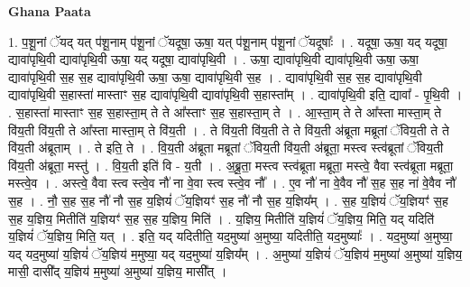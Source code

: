 \documentclass[17pt]{extarticle}
\begin{document}
\textbf{Ghana Paata } \newline

1. प॒शू॒नां ॅयद् यत् प॑शू॒नाम् प॑शू॒नां ॅयदूषा॒ ऊषा॒ यत् प॑शू॒नाम् प॑शू॒नां ॅयदूषाः᳚ । . यदूषा॒ ऊषा॒ यद् यदूषा॒ द्यावा॑पृथि॒वी द्यावा॑पृथि॒वी ऊषा॒ यद् यदूषा॒ द्यावा॑पृथि॒वी । . ऊषा॒ द्यावा॑पृथि॒वी द्यावा॑पृथि॒वी ऊषा॒ ऊषा॒ द्यावा॑पृथि॒वी स॒ह स॒ह द्यावा॑पृथि॒वी ऊषा॒ ऊषा॒ द्यावा॑पृथि॒वी स॒ह । . द्यावा॑पृथि॒वी स॒ह स॒ह द्यावा॑पृथि॒वी द्यावा॑पृथि॒वी स॒हास्ता॑ मास्ताꣳ स॒ह द्यावा॑पृथि॒वी द्यावा॑पृथि॒वी स॒हास्ता᳚म् । . द्यावा॑पृथि॒वी इति॒ द्यावा᳚ - पृ॒थि॒वी । . स॒हास्ता॑ मास्ताꣳ स॒ह स॒हास्ता॒म् ते ते आ᳚स्ताꣳ स॒ह स॒हास्ता॒म् ते । . आ॒स्ता॒म् ते ते आ᳚स्ता मास्ता॒म् ते वि॑य॒ती वि॑य॒ती ते आ᳚स्ता मास्ता॒म् ते वि॑य॒ती । . ते वि॑य॒ती वि॑य॒ती ते ते वि॑य॒ती अ॑ब्रूता मब्रूतां ॅविय॒ती ते ते वि॑य॒ती अ॑ब्रूताम् । . ते इति॒ ते । . वि॒य॒ती अ॑ब्रूता मब्रूतां ॅविय॒ती वि॑य॒ती अ॑ब्रूता॒ मस्त्व स्त्व॑ब्रूतां ॅविय॒ती वि॑य॒ती अ॑ब्रूता॒ मस्तु॑ । . वि॒य॒ती इति॑ वि - य॒ती । . अ॒ब्रू॒ता॒ मस्त्व स्त्व॑ब्रूता मब्रूता॒ मस्त्वे॒ वैवा स्त्व॑ब्रूता मब्रूता॒ मस्त्वे॒व । . अस्त्वे॒ वैवा स्त्व स्त्वे॒व नौ॑ ना वे॒वा स्त्व स्त्वे॒व नौ᳚ । . ए॒व नौ॑ ना वे॒वैव नौ॑ स॒ह स॒ह ना॑ वे॒वैव नौ॑ स॒ह । . नौ॒ स॒ह स॒ह नौ॑ नौ स॒ह य॒ज्ञियं॑ ॅय॒ज्ञियꣳ॑ स॒ह नौ॑ नौ स॒ह य॒ज्ञिय᳚म् । . स॒ह य॒ज्ञियं॑ ॅय॒ज्ञियꣳ॑ स॒ह स॒ह य॒ज्ञिय॒ मितीति॑ य॒ज्ञियꣳ॑ स॒ह स॒ह य॒ज्ञिय॒ मिति॑ । . य॒ज्ञिय॒ मितीति॑ य॒ज्ञियं॑ ॅय॒ज्ञिय॒ मिति॒ यद् यदिति॑ य॒ज्ञियं॑ ॅय॒ज्ञिय॒ मिति॒ यत् । . इति॒ यद् यदितीति॒ यद॒मुष्या॑ अ॒मुष्या॒ यदितीति॒ यद॒मुष्याः᳚ । . यद॒मुष्या॑ अ॒मुष्या॒ यद् यद॒मुष्या॑ य॒ज्ञियं॑ ॅय॒ज्ञिय॑ म॒मुष्या॒ यद् यद॒मुष्या॑ य॒ज्ञिय᳚म् । . अ॒मुष्या॑ य॒ज्ञियं॑ ॅय॒ज्ञिय॑ म॒मुष्या॑ अ॒मुष्या॑ य॒ज्ञिय॒ मासी॒ दासी᳚द् य॒ज्ञिय॑ म॒मुष्या॑ अ॒मुष्या॑ य॒ज्ञिय॒ मासी᳚त् । \newline
\end{document}
